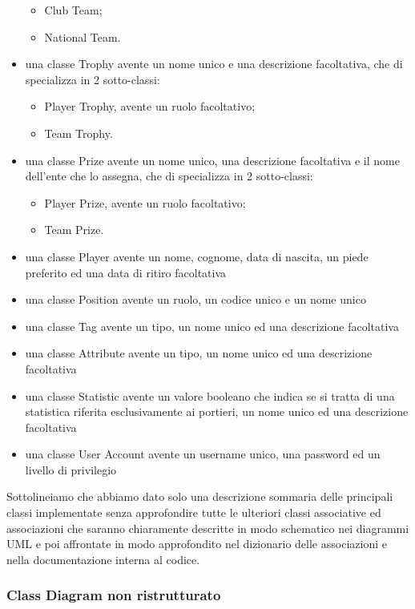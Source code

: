 \begin{itemize}
\begin{itemize}
			\item Club Team;
			\item National Team.
		\end{itemize}	
	\item una classe Trophy avente un nome unico e una descrizione facoltativa,
		che di specializza in 2 sotto-classi:
		\begin{itemize}
			\item Player Trophy, avente un ruolo facoltativo;
			\item Team Trophy.
		\end{itemize}
	\item una classe Prize avente un nome unico, una descrizione facoltativa e il nome
		dell'ente che lo assegna, che di specializza in 2 sotto-classi:	
		\begin{itemize}
			\item Player Prize, avente un ruolo facoltativo;
			\item Team Prize.
		\end{itemize}	
	\item una classe Player avente un nome, cognome, data di nascita, un piede preferito
		ed una data di ritiro facoltativa
	\item una classe Position avente un ruolo, un codice unico e un nome unico	
	\item una classe Tag avente un tipo, un nome unico ed una descrizione facoltativa	
	\item una classe Attribute avente un tipo, un nome unico ed una descrizione facoltativa	
	\item una classe Statistic avente un valore booleano che indica se si tratta di una
		statistica riferita esclusivamente ai portieri, un nome unico ed una descrizione
		facoltativa		
	\item una classe User Account avente un username unico, una password ed un livello di
		privilegio
\end{itemize}

Sottolineiamo che abbiamo dato solo una descrizione sommaria delle principali classi
implementate senza approfondire tutte le ulteriori classi associative ed associazioni
che saranno chiaramente descritte in modo schematico nei diagrammi UML e poi affrontate
in modo approfondito nel dizionario delle associazioni e nella documentazione interna al codice.
\newpage
\subsubsection{\Large Class Diagram non ristrutturato}

